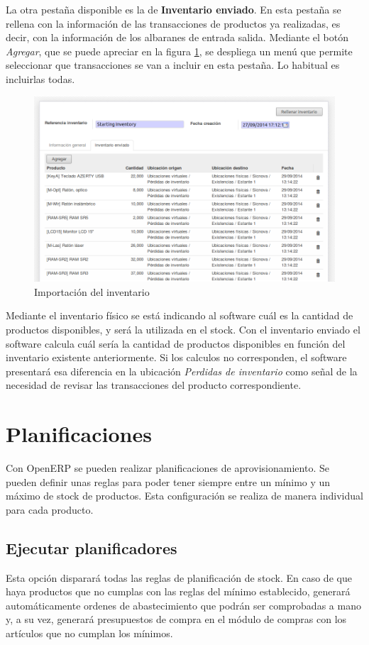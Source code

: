 La otra pestaña disponible es la de \textbf{Inventario enviado}. En esta pestaña se rellena con la información de las transacciones de productos
ya realizadas, es decir, con la información de los albaranes de entrada salida. Mediante el botón \emph{Agregar}, que se puede apreciar en la
figura \ref{ub:inventarioenviado}, se despliega un menú que permite seleccionar que transacciones se van a incluir en esta pestaña. Lo habitual es
incluirlas todas.

\begin{figure}[H]
\includegraphics[width=\textwidth]{almacen/img/inv_env.png}
\caption{Importación del inventario}
\label{ub:inventarioenviado}
\end{figure}

Mediante el inventario físico se está indicando al software cuál es la cantidad de productos disponibles, y será la utilizada en el stock.
Con el inventario enviado el software calcula cuál sería la cantidad de productos disponibles en función del inventario existente anteriormente.
Si los calculos no corresponden, el software presentará esa diferencia en la ubicación \emph{Perdidas de inventario} como señal de la necesidad
de revisar las transacciones del producto correspondiente.




\section{Planificaciones}
Con OpenERP se pueden realizar planificaciones de aprovisionamiento. Se pueden definir unas reglas para poder tener siempre entre un mínimo y
un máximo de stock de productos. Esta configuración se realiza de manera individual para cada producto.

\subsection{Ejecutar planificadores}
\label{planificadores}
Esta opción disparará todas las reglas de planificación de stock. En caso de que haya productos que no cumplas con las reglas del mínimo
establecido, generará automáticamente ordenes de abastecimiento que podrán ser comprobadas a mano y, a su vez, generará presupuestos de compra
en el módulo de compras con los artículos que no cumplan los mínimos.

